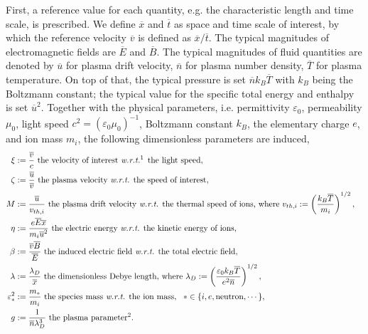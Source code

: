 \documentclass{article}
\begin{document}
First, a reference value for each quantity, e.g. the characteristic length and time scale, is prescribed. We define $\overline{x}$ and $\overline{t}$ as space and time scale of interest, by which the reference velocity $\overline{v}$ is defined as $\overline{x}/\overline{t}$. The typical magnitudes of electromagnetic fields are $\overline{E}$ and $\overline{B}$. The typical magnitudes of fluid quantities are denoted by $\overline{u}$ for plasma drift velocity, $\overline{n}$ for plasma number density, $\overline{T}$ for plasma temperature. On top of that, the typical pressure is set $\overline{n}k_B\overline{T}$ with $k_B$ being the Boltzmann constant; the typical value for the specific total energy and enthalpy is set $\overline{u}^2$. Together with the physical parameters, i.e. permittivity $\varepsilon_0$, permeability $\mu_0$, light speed $c^2 = (\varepsilon_0\mu_0)^{-1}$, Boltzmann constant $k_B$, the elementary charge $e$, and ion mass $m_i$, the following dimensionless parameters are induced,
\begin{align*} 
    \xi &:= \frac{\overline{v}}{c} \text{ the velocity of interest \emph{w.r.t.}\footnotemark[1] the light speed}, &\\
    \zeta &:= \frac{\overline{u}}{\overline{v}} \text{ the plasma velocity \emph{w.r.t.} the speed of interest}, &\\
    M &:= \frac{\overline{u}}{v_{th,i}} \text{ the plasma drift velocity \emph{w.r.t.} the thermal speed of ions, where } v_{th,i} := \left(\frac{k_B \overline{T}}{m_i}\right)^{1/2}, &\\
    \eta &:= \frac{e\overline{E}\overline{x}}{m_i\overline{u}^2} \text{ the electric energy \emph{w.r.t.} the kinetic energy of ions}, &\\
    \beta &:= \frac{\overline{v}\overline{B}}{\overline{E}} \text{ the induced electric field \emph{w.r.t.} the total electric field}, &\\
    \lambda &:= \frac{\lambda_D}{\overline{x}} \text{ the dimensionless Debye length, where }\lambda_D := \left(\frac{\varepsilon_0k_B\overline{T}}{e^2\overline{n}}\right)^{1/2}, &\\
    \varepsilon_*^2 &:= \frac{m_*}{m_i} \text{ the species mass \emph{w.r.t.} the ion mass},\ \  * \in \{i,e,\text{neutron},\cdots\}, &\\
    g &:= \frac{1}{\overline{n}\lambda_D^3} \text{ the plasma parameter\footnotemark[2]}.&
\end{align*}
\end{document}
